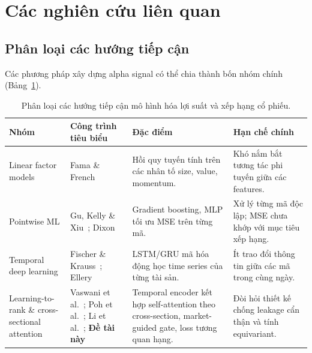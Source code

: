 \documentclass[a4paper,12pt]{article}
\begin{document}
\newpage
\section{Các nghiên cứu liên quan}\label{sec:related_work}

\subsection{Phân loại các hướng tiếp cận}
Các phương pháp xây dựng alpha signal có thể chia thành bốn nhóm chính (Bảng~\ref{tab:taxonomy}).

\begin{table}[H]
    \small\centering
    \caption{Phân loại các hướng tiếp cận mô hình hóa lợi suất và xếp hạng cổ phiếu.}
    \label{tab:taxonomy}
    \renewcommand{\arraystretch}{1.3}
    \begin{tabularx}{\textwidth}{@{} >{\raggedright\arraybackslash}p{2.8cm} >{\raggedright\arraybackslash}p{3.0cm} >{\raggedright\arraybackslash}X >{\raggedright\arraybackslash}X @{}}
        \toprule
        \textbf{Nhóm} & \textbf{Công trình tiêu biểu} & \textbf{Đặc điểm} & \textbf{Hạn chế chính} \\
        \midrule
        Linear factor models & Fama \& French~\cite{FamaFrench1992,FamaFrench1993} & Hồi quy tuyến tính trên các nhân tố size, value, momentum. & Khó nắm bắt tương tác phi tuyến giữa các features. \\
        \midrule
        Pointwise ML & Gu, Kelly \& Xiu~\cite{Gu2020}; Dixon~\cite{Dixon2020} & Gradient boosting, MLP tối ưu MSE trên từng mã. & Xử lý từng mã độc lập; MSE chưa khớp với mục tiêu xếp hạng. \\
        \midrule
        Temporal deep learning & Fischer \& Krauss~\cite{FischerKrauss2018}; Ellery~\cite{Ellery2025} & LSTM/GRU mã hóa động học time series của từng tài sản. & Ít trao đổi thông tin giữa các mã trong cùng ngày. \\
        \midrule
        Learning-to-rank \& cross-sectional attention & Vaswani et al.~\cite{Vaswani2017}; Poh et al.~\cite{Poh2021}; Li et al.~\cite{Li2024MASTER}; \textbf{Đề tài này} & Temporal encoder kết hợp self-attention theo cross-section, market-guided gate, loss tương quan hạng. & Đòi hỏi thiết kế chống leakage cẩn thận và tính equivariant. \\
        \bottomrule
    \end{tabularx}
\end{table}
\end{document}
